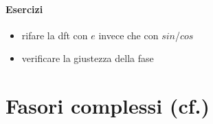 \paragraph{Esercizi}

\begin{itemize}

  \item rifare la dft con $e$ invece che con $sin$/$cos$
  \item verificare la giustezza della fase 

\end{itemize}

\section{Fasori complessi (cf.\cite[2.4 p.40]{steiglitz1974})}

